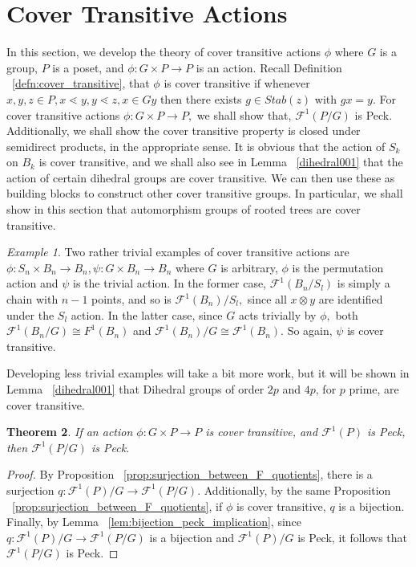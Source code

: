 \documentclass{amsart}
\newtheorem{thm}{Theorem}[subsection]
\theoremstyle{remark}
\newtheorem{eg}[thm]{Example}
\begin{document}
\section{Cover Transitive Actions}
In this section, we develop the theory of cover transitive actions $\phi$ where $G$ is a group, $P$ is a poset, and $\phi:G\times P \rightarrow P$ is an action. Recall Definition ~\ref{defn:cover_transitive}, that $\phi$ is cover transitive if whenever $x,y,z \in P,x\lessdot y,y\lessdot z,x \in Gy$ then there exists $g \in Stab(z)$ with $gx = y.$ For cover transitive actions $\phi:G\times P \rightarrow P,$ we shall show that, $\mathcal F^1(P/G)$ is Peck. Additionally, we shall show the cover transitive property is closed under semidirect products, in the appropriate sense. It is obvious that the action of $S_k$ on $B_k$ is cover transitive, and we shall also see in Lemma ~\ref{dihedral001} that the action of certain dihedral groups are cover transitive. We can then use these as building blocks to construct other cover transitive groups. In particular, we shall show in this section that automorphism groups of rooted trees are cover transitive.

\begin{eg}
\label{eg:trivial_edgequot}
Two rather trivial examples of cover transitive actions are $\phi:S_n\times B_n \rightarrow B_n,\psi:G\times B_n\rightarrow B_n$ where $G$ is arbitrary, $\phi$ is the permutation action and $\psi$ is the trivial action. In the former case, $\mathcal F^1(B_n/S_l)$ is simply a chain with $n-1$ points, and so is $\mathcal F^1(B_n)/S_l,$ since all $x\otimes y$ are identified under the $S_l$ action. In the latter case, since $G$ acts trivially by $\phi,$ both  $\mathcal F^1(B_n/G) \cong F^1(B_n)$ and $\mathcal F^1(B_n)/G \cong \mathcal F^1(B_n).$ So again, $\psi$ is cover transitive.

Developing less trivial examples will take a bit more work, but it will be shown in Lemma ~\ref{dihedral001} that Dihedral groups of order $2p$ and $4p$, for $p$ prime, are cover transitive.
\end{eg}

\begin{thm}
If an action $\phi:G \times P \rightarrow P$ is cover transitive, and $\mathcal F^1(P)$ is Peck, then $\mathcal{F}^1(P/G)$ is Peck.
\end{thm}
\begin{proof}
By Proposition ~\ref{prop:surjection_between_F_quotients}, there is a surjection $q:\mathcal F^1(P)/G \rightarrow \mathcal F^1(P/G).$ Additionally, by the same Proposition ~\ref{prop:surjection_between_F_quotients}, if $\phi$ is cover transitive, $q$ is a bijection. Finally, by Lemma ~\ref{lem:bijection_peck_implication}, since $q:\mathcal F^1(P)/G \rightarrow \mathcal F^1(P/G)$ is a bijection and $\mathcal F^1(P)/G$ is Peck, it follows that $\mathcal F^1(P/G)$ is Peck.
\end{proof}
\end{document}

